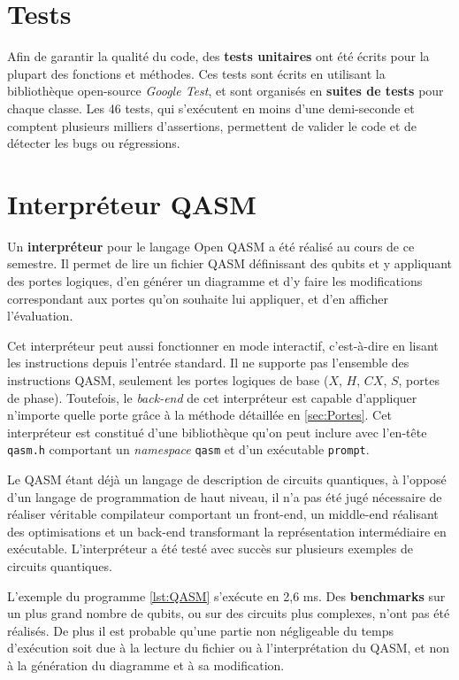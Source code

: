 \section{Tests}

Afin de garantir la qualité du code, des \textbf{tests unitaires} ont été écrits pour la plupart des fonctions et méthodes. Ces tests sont écrits en utilisant la bibliothèque open-source \textit{Google Test}, et sont organisés en \textbf{suites de tests} pour chaque classe. \cite{GoogleTest} Les 46 tests, qui s'exécutent en moins d'une demi-seconde et comptent plusieurs milliers d'assertions, permettent de valider le code et de détecter les bugs ou régressions.

\section{Interpréteur QASM}

Un \textbf{interpréteur} pour le langage Open QASM a été réalisé au cours de ce semestre. Il permet de lire un fichier QASM définissant des qubits et y appliquant des portes logiques, d'en générer un diagramme et d'y faire les modifications correspondant aux portes qu'on souhaite lui appliquer, et d'en afficher l'évaluation.

Cet interpréteur peut aussi fonctionner en mode interactif, c'est-à-dire en lisant les instructions depuis l'entrée standard. Il ne supporte pas l'ensemble des instructions QASM, seulement les portes logiques de base ($X$, $H$, $CX$, $S$, portes de phase). Toutefois, le \textit{back-end} de cet interpréteur est capable d'appliquer n'importe quelle porte grâce à la méthode détaillée en \autoref{sec:Portes}. Cet interpréteur est constitué d'une bibliothèque qu'on peut inclure avec l'en-tête \texttt{qasm.h} comportant un \textit{namespace} \texttt{qasm} et d'un exécutable \texttt{prompt}.

Le QASM étant déjà un langage de description de circuits quantiques, à l'opposé d'un langage de programmation de haut niveau, il n'a pas été jugé nécessaire de réaliser véritable compilateur comportant un front-end, un middle-end réalisant des optimisations et un back-end transformant la représentation intermédiaire en exécutable. L'interpréteur a été testé avec succès sur plusieurs exemples de circuits quantiques.

L'exemple du programme \ref{lst:QASM} s'exécute en 2,6 ms. Des \textbf{benchmarks} sur un plus grand nombre de qubits, ou sur des circuits plus complexes, n'ont pas été réalisés. De plus il est probable qu'une partie non négligeable du temps d'exécution soit due à la lecture du fichier ou à l'interprétation du QASM, et non à la génération du diagramme et à sa modification.

